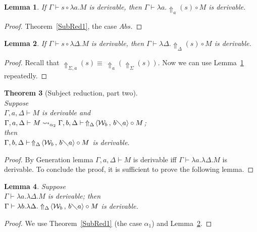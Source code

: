 \documentclass[11pt]{amsart}
\theoremstyle{plain}
\newtheorem{theorem}{Theorem}[section]
\newtheorem{lemma}[theorem]{Lemma}
\theoremstyle{definition}
\theoremstyle{remark}
\numberwithin{equation}{section}
\newcommand{\ci}{\circ}
\newcommand{\ri}{\rightsquigarrow}
\newcommand{\mi}{\,,\,}
\newcommand{\is}{\diagdown}
\newcommand{\x}{a}
\newcommand{\y}{b}
\renewcommand{\pi}{\mathcal{W}}
\begin{document}
 \begin{lemma}\label{lemma1.2}If $\Gamma\vdash s\ci\lambda \x.M$ is
 derivable, then $\Gamma\vdash\lambda
\x.\!\Uparrow_{\x}\!(s) \ci M$ is
 derivable.
 \end{lemma}
 \begin{proof}Theorem~\ref{SubRed1}, the case $Abs$.
 \end{proof}
 \begin{lemma}\label{lemma31}If $\Gamma\vdash s\ci\lambda\Delta.M$ is
derivable, then $\Gamma\vdash\lambda
\Delta.\!\Uparrow_{\Delta}\!(s)\ci M$ is derivable.
\end{lemma}
\begin{proof}Recall that
$\Uparrow_{\Sigma,\x}\!(s)\equiv\,\Uparrow_{\x}\!\!(\Uparrow_{\Sigma}\!(s))$.
Now we can use Lemma~\ref{lemma1.2} repeatedly.
\end{proof}
 \begin{theorem}[Subject reduction, part two]$ $\\
 Suppose\\
  $\Gamma,\x,\Delta\vdash M$ is derivable and\\
  $\Gamma,\x,\Delta\vdash M\ri_{\alpha_2} \Gamma,\y,\Delta\vdash\,
\Uparrow_{\Delta}\!\langle\pi_{\y}\mi \y\is \x\rangle\ci M$;\\
then\\ $\Gamma,\y,\Delta\vdash\,
\Uparrow_{\Delta}\!\langle\pi_{\y}\mi \y\is \x\rangle\ci M$ is
derivable.
\end{theorem}
\begin{proof}By Generation lemma $\Gamma,\x,\Delta\vdash M$ is derivable iff
$\Gamma\vdash\lambda \x.\lambda\Delta.M$ is derivable. To conclude
the proof, it is sufficient to prove the following lemma.
\end{proof}
\begin{lemma}Suppose\\
 $\Gamma\vdash\lambda \x.\lambda\Delta.M$ is
derivable; then\\ $\Gamma\vdash\lambda
\y.\lambda\Delta.\Uparrow_{\Delta}\!\langle\pi_{\y}\mi \y\is
\x\rangle\ci M$ is derivable.
\end{lemma}
\begin{proof}
We use Theorem~\ref{SubRed1} (the case $\alpha_1$) and
 Lemma~\ref{lemma31}.
\end{proof}
\newpage



\end{document}
